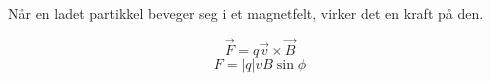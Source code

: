 Når en ladet partikkel beveger seg i et magnetfelt,
virker det en kraft på den.

$$\vec{F} = q\vec{v} \times \vec{B}$$
$$F = |q|vB\sin{\phi}$$
